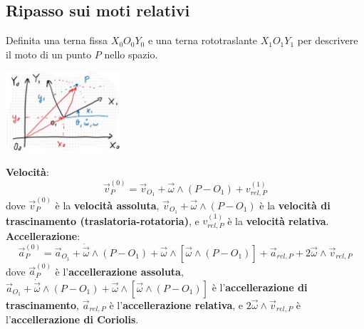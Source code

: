 \subsection{Ripasso sui moti relativi}
Definita una terna fissa $X_0 O_0 Y_0$ e una terna rototraslante $X_1O_1Y_1$ per descrivere il moto di un punto $P$ nello spazio.
\begin{center}
    \includegraphics[height=3cm]{../esercitazione2/img1.JPG}
\end{center}
\textbf{Velocità}:
\[
    \vec{v}_P^{(0)} = \vec{v}_{O_1} + \vec{\omega} \land (P-O_1) + v_{rel,P}^{(1)}
\]
dove $\vec{v}_P^{(0)}$ è la \textbf{velocità assoluta}, $\vec{v}_{O_1} + \vec{\omega} \land (P-O_1)$ è la \textbf{velocità di trascinamento (traslatoria-rotatoria)}, e $v_{rel,P}^{(1)}$ è la \textbf{velocità relativa}.\newline
\newline
\textbf{Accellerazione}:
\[
    \vec{a}_P^{(0)} = \vec{a}_{O_1} + \dot{\vec{\omega}} \land (P-O_1) + \vec{\omega} \land [\vec{\omega} \land (P-O_1)] + \vec{a}_{rel,P} + 2 \vec{\omega} \land \vec{v}_{rel,P}
\]
dove $\vec{a}_P^{(0)}$ è l'\textbf{accellerazione assoluta}, $\vec{a}_{O_1} + \dot{\vec{\omega}} \land (P-O_1) + \vec{\omega} \land [\vec{\omega} \land (P-O_1)]$ è l'\textbf{accellerazione di trascinamento}, $\vec{a}_{rel,P}$ è l'\textbf{accellerazione relativa}, e $2 \vec{\omega} \land \vec{v}_{rel,P}$ è l'\textbf{accellerazione di Coriolis}.